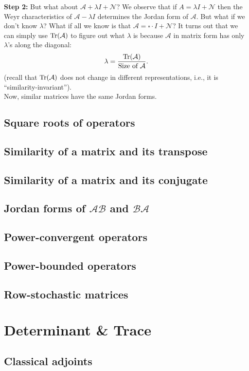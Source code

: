 \documentclass{article}
\theoremstyle{definition}
\newcommand{\A}{\mathcal{A}}
\begin{document}
\textbf{Step 2:} But what about $\A + \lambda I + \mathcal{N}$? We observe that if $A = \lambda I + \mathcal{N}$ then the Weyr characteristics of $\A - \lambda I$ determines the Jordan form of $\A$. But what if we don't know $\lambda$? What if all we know is that $\A = \square \cdot I + \mathcal{N}$? It turns out that we can simply use $\Tr(\A)$ to figure out what $\lambda$ is because $\A$ in matrix form has only $\lambda$'s along the diagonal:
\begin{align*}
\lambda = \frac{\Tr(\A)}{\text{Size of }\A}. 
\end{align*}
(recall that $\Tr(\A)$ does not change in different representations, i.e., it is ``similarity-invariant'').\\

Now, similar matrices have the same Jordan forms. 

  

\subsection{Square roots of operators}
\subsection{Similarity of a matrix and its transpose}
\subsection{Similarity of a matrix and its conjugate}
\subsection{Jordan forms of $\mathcal{AB}$ and $\mathcal{BA}$}
\subsection{Power-convergent operators}
\subsection{Power-bounded operators}
\subsection{Row-stochastic matrices}
\newpage 
\section{Determinant \& Trace}
\subsection{Classical adjoints}
\end{document}
